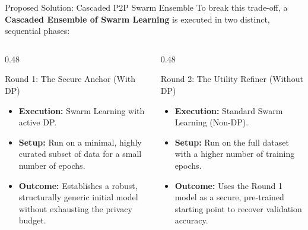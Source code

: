 \documentclass[aspectratio=169]{beamer}
\begin{document}
\begin{frame}{Proposed Solution: Cascaded P2P Swarm Ensemble}
    To break this trade-off, a \textbf{Cascaded Ensemble of Swarm Learning} is executed in two distinct, sequential phases:

    \vspace{0.3cm}
    \begin{columns}[T]
        \begin{column}{0.48\textwidth}
            \begin{block}{Round 1: The Secure Anchor (With DP)}
                \begin{itemize}
                    \item \textbf{Execution:} Swarm Learning with active DP.
                    \item \textbf{Setup:} Run on a minimal, highly curated subset of data for a small number of epochs.
                    \item \textbf{Outcome:} Establishes a robust, structurally generic initial model without exhausting the privacy budget.
                \end{itemize}
            \end{block}
        \end{column}

        \begin{column}{0.48\textwidth}
            \begin{block}{Round 2: The Utility Refiner (Without DP)}
                \begin{itemize}
                    \item \textbf{Execution:} Standard Swarm Learning (Non-DP).
                    \item \textbf{Setup:} Run on the full dataset with a higher number of training epochs.
                    \item \textbf{Outcome:} Uses the Round 1 model as a secure, pre-trained starting point to recover validation accuracy.
                \end{itemize}
            \end{block}
        \end{column}
    \end{columns}
\end{frame}
\end{document}
